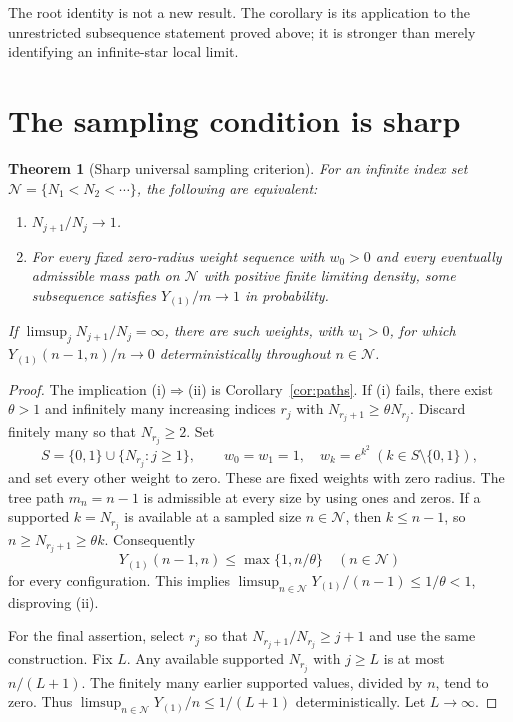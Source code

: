 \documentclass[11pt]{amsart}
\newtheorem{theorem}{Theorem}[section]
\theoremstyle{remark}\newtheorem{remark}[theorem]{Remark}
\begin{document}
The root identity is not a new result. The corollary is its application
to the unrestricted subsequence statement proved above; it is stronger
than merely identifying an infinite-star local limit.

\section{The sampling condition is sharp}\label{sec:sharp}
\begin{theorem}[Sharp universal sampling criterion]\label{thm:sampling}
For an infinite index set $\mathcal N=\{N_1<N_2<\cdots\}$, the following
are equivalent:
\begin{enumerate}[label=(\roman*)]
\item $N_{j+1}/N_j\to1$.
\item For every fixed zero-radius weight sequence with $w_0>0$ and every
      eventually admissible mass path on $\mathcal N$ with positive finite
      limiting density, some subsequence satisfies $Y_{(1)}/m\to1$ in
      probability.
\end{enumerate}
If $\limsup_jN_{j+1}/N_j=\infty$, there are such weights, with $w_1>0$, for
which $Y_{(1)}(n-1,n)/n\to0$ deterministically throughout $n\in\mathcal N$.
\end{theorem}

\begin{proof}
The implication (i)$\Rightarrow$(ii) is Corollary~\ref{cor:paths}.
If (i) fails, there exist $\theta>1$ and infinitely many increasing indices
$r_j$ with $N_{r_j+1}\ge\theta N_{r_j}$. Discard finitely many so that
$N_{r_j}\ge2$. Set
\[
 S=\{0,1\}\cup\{N_{r_j}:j\ge1\},\qquad
 w_0=w_1=1,\quad w_k=e^{k^2}\ (k\in S\setminus\{0,1\}),
\]
and set every other weight to zero. These are fixed weights with zero
radius. The tree path $m_n=n-1$ is admissible at every size by using ones
and zeros. If a supported $k=N_{r_j}$ is available at a sampled size
$n\in\mathcal N$, then $k\le n-1$, so
$n\ge N_{r_j+1}\ge\theta k$. Consequently
\[
 Y_{(1)}(n-1,n)\le\max\{1,n/\theta\}
 \quad(n\in\mathcal N)
\]
for every configuration. This implies
$\limsup_{n\in\mathcal N}Y_{(1)}/(n-1)\le1/\theta<1$, disproving (ii).

For the final assertion, select $r_j$ so that
$N_{r_j+1}/N_{r_j}\ge j+1$ and use the same construction. Fix $L$.
Any available supported $N_{r_j}$ with $j\ge L$ is at most $n/(L+1)$.
The finitely many earlier supported values, divided by $n$, tend to zero.
Thus $\limsup_{n\in\mathcal N}Y_{(1)}/n\le1/(L+1)$ deterministically.
Let $L\to\infty$.
\end{proof}
\end{document}
